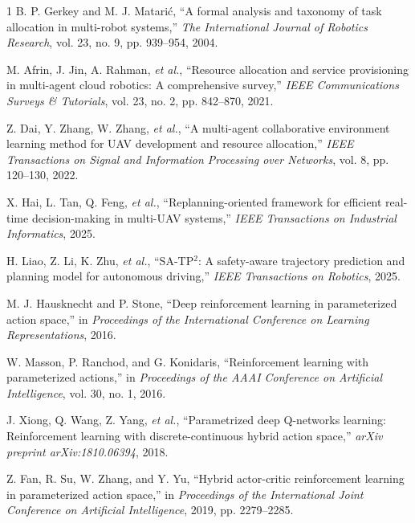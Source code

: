 \documentclass[letterpaper, 10 pt, conference]{ieeeconf}
\begin{document}


\begin{thebibliography}{1}
    B. P. Gerkey and M. J. Matari{\'c}, ``A formal analysis and taxonomy of task allocation in multi-robot systems,'' \emph{The International Journal of Robotics Research}, vol. 23, no. 9, pp. 939--954, 2004.

    M. Afrin, J. Jin, A. Rahman, \textit{et al.}, ``Resource allocation and service provisioning in multi-agent cloud robotics: A comprehensive survey,'' \emph{IEEE Communications Surveys \& Tutorials}, vol. 23, no. 2, pp. 842--870, 2021.

    Z. Dai, Y. Zhang, W. Zhang, \textit{et al.}, ``A multi-agent collaborative environment learning method for {{UAV}} development and resource allocation,'' \emph{IEEE Transactions on Signal and Information Processing over Networks}, vol. 8, pp. 120--130, 2022.

    X. Hai, L. Tan, Q. Feng, \textit{et al.}, ``Replanning-oriented framework for efficient real-time decision-making in multi-{{UAV}} systems,'' \emph{IEEE Transactions on Industrial Informatics}, 2025.

    H. Liao, Z. Li, K. Zhu, \textit{et al.}, ``{{SA-TP}}$^2$: A safety-aware trajectory prediction and planning model for autonomous driving,'' \emph{IEEE Transactions on Robotics}, 2025.

    M. J. Hausknecht and P. Stone, ``Deep reinforcement learning in parameterized action space,'' in \emph{Proceedings of the International Conference on Learning Representations}, 2016.

    W. Masson, P. Ranchod, and G. Konidaris, ``Reinforcement learning with parameterized actions,'' in \emph{Proceedings of the AAAI Conference on Artificial Intelligence}, vol. 30, no. 1, 2016.

    J. Xiong, Q. Wang, Z. Yang, \textit{et al.}, ``Parametrized deep {{Q}}-networks learning: Reinforcement learning with discrete-continuous hybrid action space,'' \emph{arXiv preprint arXiv:1810.06394}, 2018.

    Z. Fan, R. Su, W. Zhang, and Y. Yu, ``Hybrid actor-critic reinforcement learning in parameterized action space,'' in \emph{Proceedings of the International Joint Conference on Artificial Intelligence}, 2019, pp. 2279--2285.


\end{thebibliography}
\end{document}
